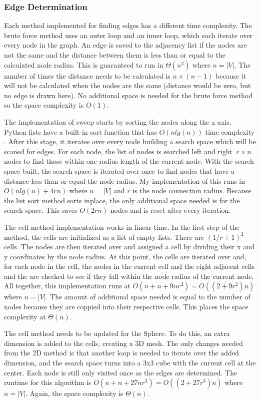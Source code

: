 \documentclass{article}
\begin{document}
        \subsubsection{Edge Determination}
        Each method implemented for finding edges has a different time complexity. The brute force method uses an outer loop and an inner loop, which each iterate over every node in the graph. An edge is saved to the adjacency list if the nodes are not the same and the distance between them is less than or equal to the calculated node radius. This is guaranteed to run in $\Theta\left(n^2\right)$ where $n = |V|$. The number of times the distance needs to be calculated is $n \times (n-1)$ because it will not be calculated when the nodes are the same (distance would be zero, but no edge is drawn here). No additional space is needed for the brute force method so the space complexity is $O(1)$.
        \par
        The implementation of sweep starts by sorting the nodes along the x-axis. Python lists have a built-in sort function that has $O\left(n lg(n)\right)$ time complexity \cite{listsort}. After this stage, it iterates over every node building a search space which will be scaned for edges. For each node, the list of nodes is searched left and right $~r\times n$ nodes to find those within one radius length of the current node. With the search space built, the search space is iterated over once to find nodes that have a distance less than or equal the node radius. My implementation of this runs in $O\left(n lg(n) + 4rn\right)$ where $n = |V|$ and $r$ is the node connection radius. Because the list sort method sorts inplace, the only additional space needed is for the search space. This saves $O(2rn)$ nodes and is reset after every iteration.
        \par
        The cell method implementation works in linear time. In the first step of the method, the cells are initialized as a list of empty lists. There are $(1/r + 1)^2$ cells. The nodes are then iterated over and assigned a cell by dividing their x and y coordinates by the node radius. At this point, the cells are iterated over and, for each node in the cell, the nodes in the current cell and the eight adjacent cells and the are checked to see if they fall within the node radius of the current node. All together, this implementation runs at $O\left(n + n + 9nr^2\right) = O\left((2 + 9r^2)n\right)$ where $n = |V|$. The amount of additional space needed is equal to the number of nodes because they are coppied into their respective cells. This places the space complexity at $\Theta(n)$.
        \par
        The cell method needs to be updated for the Sphere. To do this, an extra dimension is added to the cells, creating a 3D mesh. The only changes needed from the 2D method is that another loop is needed to iterate over the added dimension, and the search space turns into a 3x3 cube with the current cell at the center. Each node is still only visited once as the edges are determined. The runtime for this algorithm is $O\left(n + n + 27nr^3\right) = O\left((2 + 27r^3)n\right)$ where $n = |V|$. Again, the space complexity is $\Theta(n)$.
\end{document}
